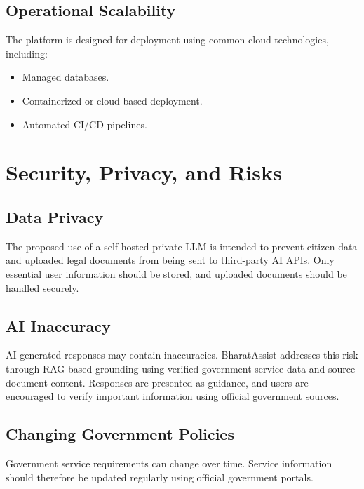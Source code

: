 \documentclass[12pt,a4paper]{report}
\begin{document}
\section{Operational Scalability}

The platform is designed for deployment using common cloud technologies, including:

\begin{itemize}[leftmargin=*]
    \item Managed databases.
    \item Containerized or cloud-based deployment.
    \item Automated CI/CD pipelines.
\end{itemize}

\chapter{Security, Privacy, and Risks}

\section{Data Privacy}

The proposed use of a self-hosted private LLM is intended to prevent citizen data and uploaded legal documents from being sent to third-party AI APIs. Only essential user information should be stored, and uploaded documents should be handled securely.

\section{AI Inaccuracy}

AI-generated responses may contain inaccuracies. BharatAssist addresses this risk through RAG-based grounding using verified government service data and source-document content. Responses are presented as guidance, and users are encouraged to verify important information using official government sources.

\section{Changing Government Policies}

Government service requirements can change over time. Service information should therefore be updated regularly using official government portals.
\end{document}
